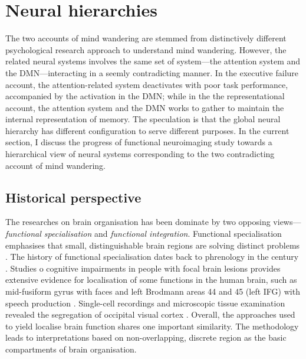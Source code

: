 \section{Neural hierarchies}
\label{ch:intro:neural}

The two accounts of mind wandering are stemmed from distinctively different psychological research approach to understand mind wandering. However, the related neural systems involves the same set of system---the attention system and the DMN---interacting in a seemly contradicting manner. In the executive failure account, the attention-related system deactivates with poor task performance, accompanied by the activation in the DMN; while in the the representational account, the attention system and the DMN works to gather to maintain the internal representation of memory. The speculation is that the global neural hierarchy has different configuration to serve different purposes. In the current section, I discuss the progress of functional neuroimaging study towards a hierarchical view of neural systems corresponding to the two contradicting account of mind wandering.

\subsection{Historical perspective}

The researches on brain organisation has been dominate by two opposing views---\textit{functional specialisation} and \textit{functional integration}. Functional specialisation emphasises that small, distinguishable brain regions are solving distinct problems \cite{Kanwisher2010}. The history of functional specialisation dates back to phrenology in the  century \cite<for more history about functional localisation, see supporting information in >{Kanwisher2010}. Studies o cognitive impairments in people with focal brain lesions provides extensive evidence for localisation of some functions in the human brain, such as mid-fusiform gyrus with faces \cite{Iaria2008} and left Brodmann areas 44 and 45 (left IFG) with speech production \cite{Broca1861}. Single-cell recordings and microscopic tissue examination revealed the segregation of occipital visual cortex \cite{Zeki1978}. Overall, the approaches used to yield localise brain function shares one important similarity. The methodology leads to interpretations based on non-overlapping, discrete region as the basic compartments of brain organisation. 

